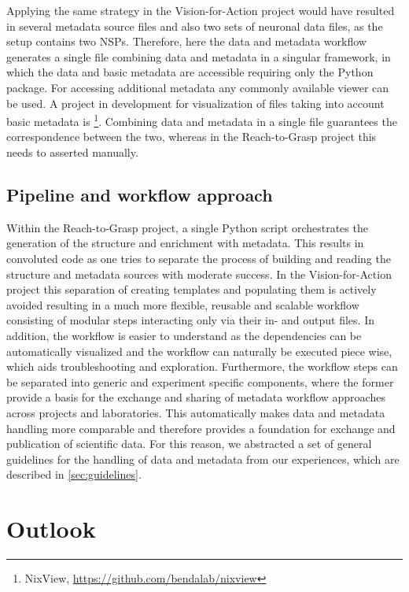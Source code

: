 Applying the same strategy in the Vision-for-Action project would have resulted in several metadata source files and also two sets of neuronal data files, as the setup contains two NSPs. Therefore, here the data and metadata workflow generates a single  file combining data and metadata in a singular framework, in which the data and basic metadata are accessible requiring only the Python  package. For accessing additional metadata any commonly available  viewer can be used. A project in development for visualization of  files taking into account basic metadata is \footnote{NixView, \url{https://github.com/bendalab/nixview}}. Combining data and metadata in a single file guarantees the correspondence between the two, whereas in the Reach-to-Grasp project this needs to asserted manually.

\subsection{Pipeline and workflow approach}
Within the Reach-to-Grasp project, a single Python script orchestrates the generation of the  structure and enrichment with metadata. This results in convoluted code as one tries to separate the process of building and reading the  structure and metadata sources with moderate success. In the Vision-for-Action project this separation of creating templates and populating them is actively avoided resulting in a much more flexible, reusable and scalable workflow consisting of modular steps interacting only via their in- and output files. In addition, the workflow is easier to understand as the dependencies can be automatically visualized and the workflow can naturally be executed piece wise, which aids troubleshooting and exploration. Furthermore, the workflow steps can be separated into generic and experiment specific components, where the former provide a basis for the exchange and sharing of metadata workflow approaches across projects and laboratories. This automatically makes data and metadata handling more comparable and therefore provides a foundation for exchange and publication of scientific data. For this reason, we abstracted a set of general guidelines for the handling of data and metadata from our experiences, which are described in \cref{sec:guidelines}.


\section{Outlook}
